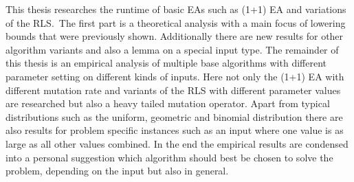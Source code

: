 This thesis researches the runtime of basic EAs such as (1+1) EA and variations of the RLS.\ 
The first part is a theoretical analysis with a main focus of lowering bounds that were previously shown.
Additionally there are new results for other algorithm variants and also a lemma on a special input type.
The remainder of this thesis is an empirical analysis of multiple base algorithms with different parameter setting on different kinds of inputs.
Here not only the (1+1) EA with different mutation rate and variants of the RLS with different parameter values are researched but also a heavy tailed mutation operator.
Apart from typical distributions such as the uniform, geometric and binomial distribution there are also results for problem specific instances such as an input where one value is as large as all other values combined.
In the end the empirical results are condensed into a personal suggestion which algorithm should best be chosen to solve the problem, depending on the input but also in general.

